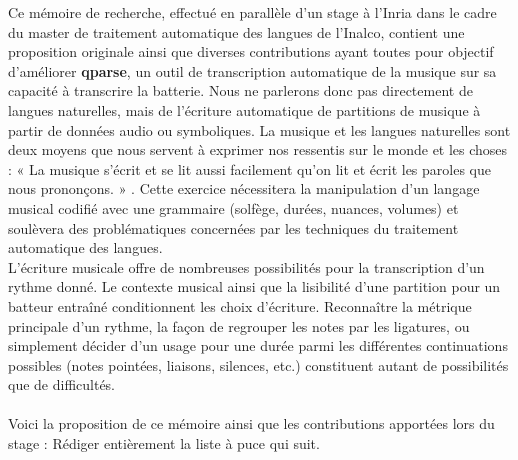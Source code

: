 Ce mémoire de recherche, effectué en parallèle d’un stage à l’Inria dans le
cadre du master de traitement automatique des langues de l’Inalco, contient
une proposition originale ainsi que diverses contributions ayant toutes pour
objectif d’améliorer \textbf{qparse}, un outil de transcription automatique de
la musique sur sa capacité à transcrire la batterie. Nous ne parlerons donc pas
directement de langues naturelles, mais de l’écriture automatique de partitions
de musique à partir de données audio ou symboliques. La musique et les langues
naturelles sont deux moyens que nous servent à exprimer nos ressentis sur le
monde et les choses : « La musique s’écrit et se lit aussi facilement qu’on lit
et écrit les paroles que nous prononçons. » \cite{danhauser}.
Cette exercice nécessitera la manipulation d’un langage
musical codifié avec une grammaire (solfège, durées, nuances, volumes) et
soulèvera des problématiques concernées par les techniques du traitement
automatique des langues.\\
L’écriture musicale offre de nombreuses possibilités pour la transcription d’un
rythme donné. Le contexte musical ainsi que la lisibilité d’une partition pour
un batteur entraîné conditionnent les choix d’écriture. Reconnaître la
métrique principale d’un rythme, la façon de regrouper les notes par les
ligatures, ou simplement décider d’un usage pour une durée parmi les
différentes continuations possibles (notes pointées, liaisons, silences, etc.)
constituent autant de possibilités que de difficultés.\\\\
Voici la proposition de ce mémoire ainsi que les contributions apportées lors
du stage :
Rédiger entièrement la liste à puce qui suit.

